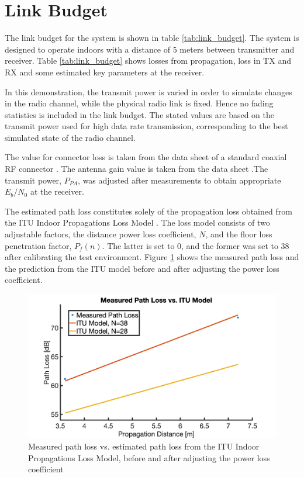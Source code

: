 \section{Link Budget}
\label{sec:link_budget}
The link budget for the system is shown in table \ref{tab:link_budget}. The system is designed to operate indoors with a distance of 5 meters between transmitter and receiver. Table \ref{tab:link_budget} shows losses from propagation, loss in TX and RX and some estimated key parameters at the receiver. 

In this demonstration, the transmit power is varied in order to simulate changes in the radio channel, while the physical radio link is fixed. Hence no fading statistics is included in the link budget. The stated values are based on the transmit power used for high data rate transmission, corresponding to the best simulated state of the radio channel. 



The value for connector loss is taken from the data sheet of a standard coaxial RF connector \cite{rfconnector}. The antenna gain value is taken from the data sheet \cite{antenna}.The transmit power, $P_{PA}$, was adjusted after measurements to obtain appropriate $E_b/N_0$ at the receiver.

The estimated path loss constitutes solely of the propagation loss obtained from the ITU Indoor Propagations Loss Model \cite{itu_model}. The loss model consists of two adjustable factors, the distance power loss coefficient, $N$, and the floor loss penetration factor, $P_f(n)$. The latter is set to 0, and the former was set to 38 after calibrating the test environment. Figure \ref{fig:path_loss} shows the measured path loss and the prediction from the ITU model before and after adjusting the power loss coefficient.

\begin{figure}[htbp]
\begin{center}
\includegraphics[width=\figW\linewidth]{PathLoss.png}
\caption{Measured path loss vs. estimated path loss from the ITU Indoor Propagations Loss Model, before and after adjusting the power loss coefficient}
\label{fig:path_loss}
\end{center}
\end{figure}

